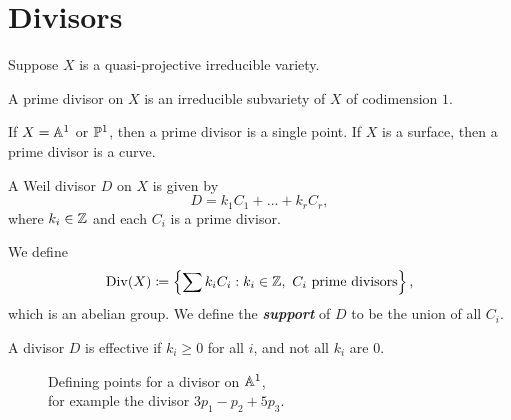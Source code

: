 
\section{Divisors}

Suppose $X$ is a quasi-projective irreducible variety.

\begin{definition}
    A prime divisor on $X$ is an irreducible subvariety of $X$ of codimension $1$.
\end{definition}

If $X = \aa^1$ or $\pp^1$, then a prime divisor is a single point.
If $X$ is a surface, then a prime divisor is a curve.

\begin{definition}
    A Weil divisor $D$ on $X$ is given by
    \[
        D = k_1C_1 + \ldots + k_rC_r,
    \]
    where $k_i\in \z$ and each $C_i$ is a prime divisor.
\end{definition}

We define
\[
    \Div(X) \coloneqq \left\{\sum k_i C_i : k_i\in \z,\ C_i \text{ prime divisors}\right\},
\]
which is an abelian group.
We define the \textbf{\textit{support}} of $D$ to be the union of all $C_i$.

\begin{definition}[Effective]
    A divisor $D$ is effective if $k_i \geq 0$ for all $i$, and not all $k_i$ are $0$.
\end{definition}

\begin{figure}[H]
    \centering
    \captionsetup{justification=centering}

    \colorbox{white}{%
        \color{black}
    }
    \caption{Defining points for a divisor on $\aa^1$, \\
    for example the divisor $3p_1 - p_2 + 5p_3$.}
\end{figure}

